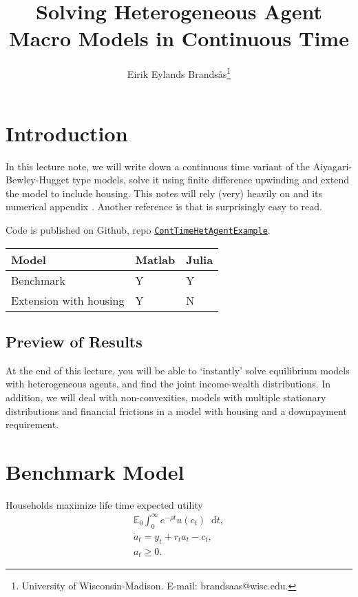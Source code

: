 \documentclass[12pt]{article}
\title{\vspace{-7ex}Solving Heterogeneous Agent Macro Models in Continuous Time}
\author{Eirik Eylands Brands\aa s\thanks{University  of  Wisconsin-Madison.  E-mail: brandsaas@wisc.edu. }}
\newcommand{\E}{\mathbb{E}}
\DeclareMathOperator{\1}{\mathbbm{1}}
\newcommand*\diff{\mathop{}\!\mathrm{d}}
\begin{document}
\maketitle

\section{Introduction}
In this lecture note, we will write down a continuous time variant of the Aiyagari-Bewley-Hugget type models, solve it using finite difference upwinding and extend the model to include housing. This notes will rely (very) heavily on \cite{Achdou2017} and its numerical appendix \cite{Achdou2017a}. Another reference is \cite{Candler1999} that is surprisingly easy to read.

Code is published on Github, repo \href{https://github.com/eirikeb/ContTimeHetAgentExample/}{\texttt{ContTimeHetAgentExample}}. 

\begin{table}[h]
\begin{tabular}{@{}lll@{}} \toprule
Model         &  Matlab     & Julia  \\ \midrule
Benchmark     &  Y& Y \\
Extension with housing & Y &  N \\ \bottomrule
\end{tabular}
\end{table}

\subsection{Preview of Results}
At the end of this lecture, you will be able to `instantly' solve equilibrium models with heterogeneous agents, and find the joint income-wealth distributions. In addition, we will deal with non-convexities, models with multiple stationary distributions and financial frictions in a model with housing and a downpayment requirement.

\section{Benchmark Model}
Households maximize life time expected utility
\begin{align}
\E_0 \int_0^\infty e^{-\rho t} u(c_t) \diff t, \\
\dot a_t = y_t + r_t a_t - c_t, \\
a_t\ge 0.
\end{align}
\end{document}
